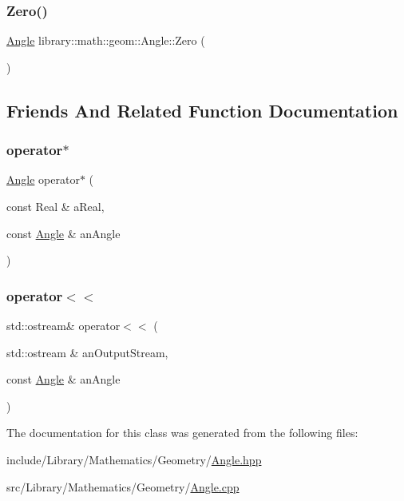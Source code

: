 \subsubsection{\texorpdfstring{Zero()}{Zero()}}
{\footnotesize\ttfamily \hyperlink{classlibrary_1_1math_1_1geom_1_1_angle}{Angle} library\+::math\+::geom\+::\+Angle\+::\+Zero (\begin{DoxyParamCaption}{ }\end{DoxyParamCaption})\hspace{0.3cm}{\ttfamily [static]}}



\subsection{Friends And Related Function Documentation}
\mbox{\label{classlibrary_1_1math_1_1geom_1_1_angle_af699984b24759466957ecddaa7e61fc9}} 
\subsubsection{\texorpdfstring{operator$\ast$}{operator*}}
{\footnotesize\ttfamily \hyperlink{classlibrary_1_1math_1_1geom_1_1_angle}{Angle} operator$\ast$ (\begin{DoxyParamCaption}\item[{const Real \&}]{a\+Real,  }\item[{const \hyperlink{classlibrary_1_1math_1_1geom_1_1_angle}{Angle} \&}]{an\+Angle }\end{DoxyParamCaption})\hspace{0.3cm}{\ttfamily [friend]}}

\mbox{\label{classlibrary_1_1math_1_1geom_1_1_angle_a0846b77ee3281e8a559197c3c3208eed}} 
\subsubsection{\texorpdfstring{operator$<$$<$}{operator<<}}
{\footnotesize\ttfamily std\+::ostream\& operator$<$$<$ (\begin{DoxyParamCaption}\item[{std\+::ostream \&}]{an\+Output\+Stream,  }\item[{const \hyperlink{classlibrary_1_1math_1_1geom_1_1_angle}{Angle} \&}]{an\+Angle }\end{DoxyParamCaption})\hspace{0.3cm}{\ttfamily [friend]}}



The documentation for this class was generated from the following files\+:\begin{DoxyCompactItemize}
\item 
include/\+Library/\+Mathematics/\+Geometry/\hyperlink{_angle_8hpp}{Angle.\+hpp}\item 
src/\+Library/\+Mathematics/\+Geometry/\hyperlink{_angle_8cpp}{Angle.\+cpp}\end{DoxyCompactItemize}
